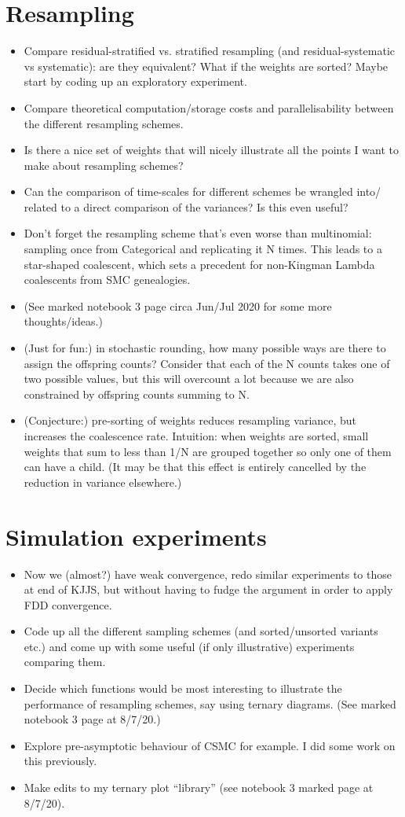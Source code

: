 \documentclass{article}
\begin{document}
\section*{Resampling}
\begin{itemize}
\item Compare residual-stratified vs. stratified resampling (and residual-systematic vs systematic): are they equivalent? What if the weights are sorted? Maybe start by coding up an exploratory experiment.
\item Compare theoretical computation/storage costs and parallelisability between the different resampling schemes.
\item Is there a nice set of weights that will nicely illustrate all the points I want to make about resampling schemes?
\item Can the comparison of time-scales for different schemes be wrangled into/ related to a direct comparison of the variances? Is this even useful?
\item Don't forget the resampling scheme that's even worse than multinomial: sampling once from Categorical and replicating it N times. This leads to a star-shaped coalescent, which sets a precedent for non-Kingman Lambda coalescents from SMC genealogies.
\item (See marked notebook 3 page circa Jun/Jul 2020 for some more thoughts/ideas.)
\item (Just for fun:) in stochastic rounding, how many possible ways are there to assign the offspring counts? Consider that each of the N counts takes one of two possible values, but this will overcount a lot because we are also constrained by offspring counts summing to N.
\item (Conjecture:) pre-sorting of weights reduces resampling variance, but increases the coalescence rate. Intuition: when weights are sorted, small weights that sum to less than 1/N are grouped together so only one of them can have a child. (It may be that this effect is entirely cancelled by the reduction in variance elsewhere.)
\end{itemize}

\section*{Simulation experiments}
\begin{itemize}
\item Now we (almost?) have weak convergence, redo similar experiments to those at end of KJJS, but without having to fudge the argument in order to apply FDD convergence.
\item Code up all the different sampling schemes (and sorted/unsorted variants etc.) and come up with some useful (if only illustrative) experiments comparing them.
\item Decide which functions would be most interesting to illustrate the performance of resampling schemes, say using ternary diagrams. (See marked notebook 3 page at 8/7/20.)
\item Explore pre-asymptotic behaviour of CSMC for example. I did some work on this previously.
\item Make edits to my ternary plot ``library'' (see notebook 3 marked page at 8/7/20).
\end{itemize}
\end{document}
